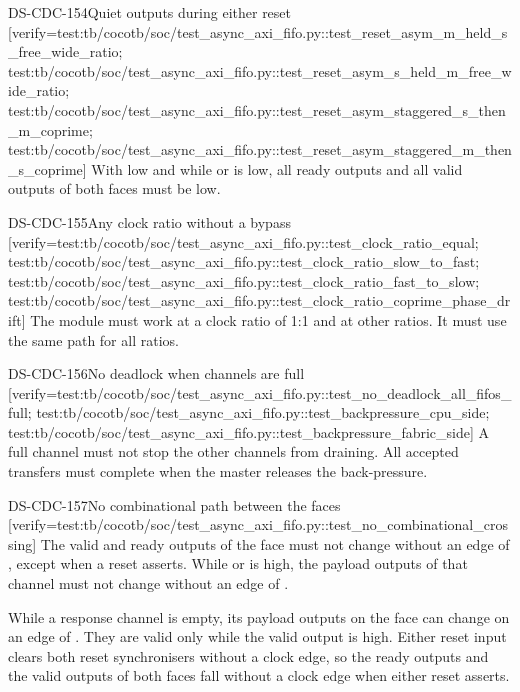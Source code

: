 \begin{requirement}{DS-CDC-154}{Quiet outputs during either reset}
[verify={test:tb/cocotb/soc/test_async_axi_fifo.py::test_reset_asym_m_held_s_free_wide_ratio; test:tb/cocotb/soc/test_async_axi_fifo.py::test_reset_asym_s_held_m_free_wide_ratio; test:tb/cocotb/soc/test_async_axi_fifo.py::test_reset_asym_staggered_s_then_m_coprime; test:tb/cocotb/soc/test_async_axi_fifo.py::test_reset_asym_staggered_m_then_s_coprime}]
With  low and while  or  is low, all ready outputs and all valid outputs of both faces must be low.
\end{requirement}

\begin{requirement}{DS-CDC-155}{Any clock ratio without a bypass}
[verify={test:tb/cocotb/soc/test_async_axi_fifo.py::test_clock_ratio_equal; test:tb/cocotb/soc/test_async_axi_fifo.py::test_clock_ratio_slow_to_fast; test:tb/cocotb/soc/test_async_axi_fifo.py::test_clock_ratio_fast_to_slow; test:tb/cocotb/soc/test_async_axi_fifo.py::test_clock_ratio_coprime_phase_drift}]
The module must work at a clock ratio of 1:1 and at other ratios. It must use the same path for all ratios.
\end{requirement}

\begin{requirement}{DS-CDC-156}{No deadlock when channels are full}
[verify={test:tb/cocotb/soc/test_async_axi_fifo.py::test_no_deadlock_all_fifos_full; test:tb/cocotb/soc/test_async_axi_fifo.py::test_backpressure_cpu_side; test:tb/cocotb/soc/test_async_axi_fifo.py::test_backpressure_fabric_side}]
A full channel must not stop the other channels from draining. All accepted transfers must complete when the master releases the back-pressure.
\end{requirement}

\begin{requirement}{DS-CDC-157}{No combinational path between the faces}
[verify={test:tb/cocotb/soc/test_async_axi_fifo.py::test_no_combinational_crossing}]
The valid and ready outputs of the  face must not change without an edge of , except when a reset asserts. While  or  is high, the payload outputs of that channel must not change without an edge of .
\end{requirement}
\begin{information}
While a response channel is empty, its payload outputs on the  face can change on an edge of . They are valid only while the valid output is high. Either reset input clears both reset synchronisers without a clock edge, so the ready outputs and the valid outputs of both faces fall without a clock edge when either reset asserts.
\end{information}


